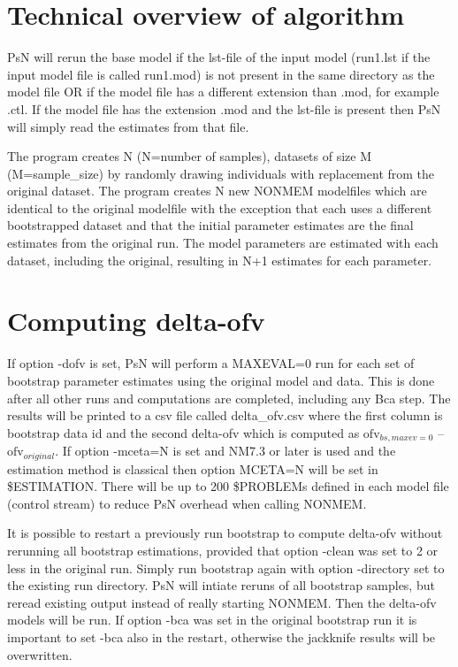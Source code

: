 \section{Technical overview of algorithm}

PsN will rerun the base model if the lst-file of the input model (run1.lst if the input model file is called run1.mod) is not present in the same directory as the model file OR if the model file has a different extension than .mod, for example .ctl. If the model file has the extension .mod and the lst-file is present then PsN will simply read the estimates from that file.

The program creates N (N=number of samples), datasets of size M (M=sample\_size) by randomly drawing individuals with replacement from the original dataset. The program creates N new NONMEM modelfiles which are identical to the original modelfile with the exception that each uses a different  bootstrapped dataset and that the initial parameter estimates are the final estimates from the original run. The model parameters are estimated with each dataset, including the original, resulting in N+1 estimates for each parameter.

\section{Computing delta-ofv}

If option -dofv is set, PsN will perform a MAXEVAL=0 run for each set of bootstrap parameter estimates using the original model and data. This is done after all other runs and computations are completed, including any Bca step. The results will be printed to a csv file called delta\_ofv.csv where the first column is bootstrap data id and the second delta-ofv which is computed as 
$\mathrm{ofv}_{bs,maxev=0}$ – $\mathrm{ofv}_{original}$. If option -mceta=N is set and NM7.3 or later is used and the estimation method is classical then option MCETA=N will be set in \$ESTIMATION. There will be up to 200 \$PROBLEMs defined in each model file (control stream) to reduce PsN overhead when calling NONMEM.

It is possible to restart a previously run bootstrap to compute delta-ofv without rerunning all bootstrap estimations, provided that option -clean was set to 2 or less in the original run. Simply run bootstrap again with option -directory set to the existing run directory. PsN will intiate reruns of all bootstrap samples, but reread existing output instead of really starting NONMEM. Then the delta-ofv models will be run. If option -bca was set in the original bootstrap run it is important to set -bca also in the restart, otherwise the jackknife results will be overwritten. 

